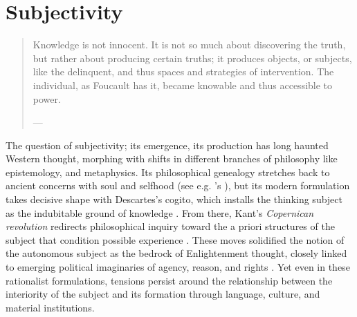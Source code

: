 

\section{Subjectivity}

\begin{quote}
	Knowledge is not innocent. It is not so much about discovering the truth, but rather about producing certain truths; it produces objects, or subjects, like the delinquent, and thus spaces and strategies of intervention. The individual, as Foucault has it, became knowable and thus accessible to power.

	— \cite[11]{Krasmann2017}
\end{quote}


\greensquare
The question of subjectivity; its emergence, its production has long haunted Western thought, morphing with shifts in different branches of philosophy like epistemology, and metaphysics. Its philosophical genealogy stretches back to ancient concerns with soul and selfhood (see e.g. \citeauthor{aristotle1986}'s  \cite*{aristotle1986}), but its modern formulation takes decisive shape with Descartes’s cogito, which installs the thinking subject as the indubitable ground of knowledge \parencite{descartes2008}. From there, Kant’s \textit{Copernican revolution} redirects philosophical inquiry toward the a priori structures of the subject that condition possible experience \parencite{kant2009}. These moves solidified the notion of the autonomous subject as the bedrock of Enlightenment thought, closely linked to emerging political imaginaries of agency, reason, and rights \parencite{taylor1989}. Yet even in these rationalist formulations, tensions persist around the relationship between the interiority of the subject and its formation through language, culture, and material institutions.

